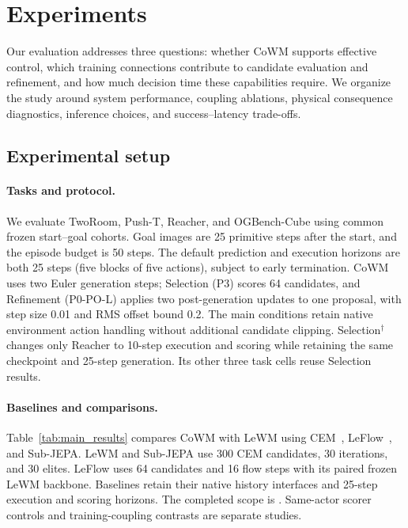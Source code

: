 \section{Experiments}
\label{sec:experiments}
Our evaluation addresses three questions: whether CoWM supports effective control, which training connections contribute to candidate evaluation and refinement, and how much decision time these capabilities require. We organize the study around system performance, coupling ablations, physical consequence diagnostics, inference choices, and success--latency trade-offs.

\subsection{Experimental setup}
\label{sec:eval_protocol}
\paragraph{Tasks and protocol.}
We evaluate TwoRoom, Push-T, Reacher, and OGBench-Cube using common frozen start--goal cohorts. Goal images are 25 primitive steps after the start, and the episode budget is 50 steps. The default prediction and execution horizons are both 25 steps (five blocks of five actions), subject to early termination. CoWM uses two Euler generation steps; Selection (P3) scores 64 candidates, and Refinement (P0-PO-L) applies two post-generation updates to one proposal, with step size 0.01 and RMS offset bound 0.2. The main conditions retain native environment action handling without additional candidate clipping. Selection$^{\dagger}$ changes only Reacher to 10-step execution and scoring while retaining the same checkpoint and 25-step generation. Its other three task cells reuse Selection results.

\paragraph{Baselines and comparisons.}
Table~\ref{tab:main_results} compares CoWM with LeWM using CEM~\cite{maes2026lewm}, LeFlow~\cite{huang2026leflow}, and Sub-JEPA. LeWM and Sub-JEPA use 300 CEM candidates, 30 iterations, and 30 elites. LeFlow uses 64 candidates and 16 flow steps with its paired frozen LeWM backbone. Baselines retain their native history interfaces and 25-step execution and scoring horizons. The completed scope is . Same-actor scorer controls and training-coupling contrasts are separate studies.

